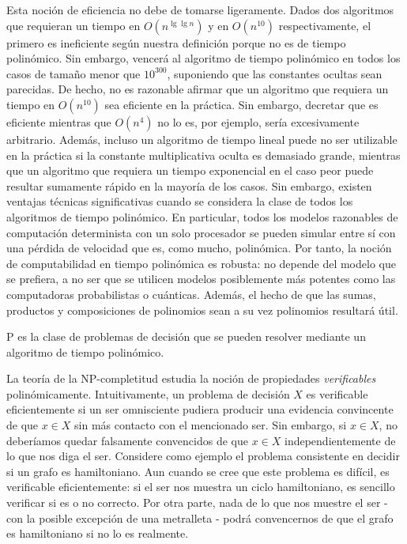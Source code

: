 Esta noción de eficiencia no debe de tomarse ligeramente. Dados dos algoritmos que requieran un tiempo en $O(n^{\lg \lg n})$ y en $O(n^{10})$ respectivamente, el primero es ineficiente según nuestra definición porque no es de tiempo polinómico. Sin embargo, vencerá al algoritmo de tiempo polinómico en todos los casos de tamaño menor que $10^{300}$, suponiendo que las constantes ocultas sean parecidas. De hecho, no es razonable afirmar que un algoritmo que requiera un tiempo en $O(n^{10})$ sea eficiente en la práctica. Sin embargo, decretar que es eficiente mientras que $O(n^4)$ no lo es, por ejemplo, sería excesivamente arbitrario. Además, incluso un algoritmo de tiempo lineal puede no ser utilizable en la práctica si la constante multiplicativa oculta es demasiado grande, mientras que un algoritmo que requiera un tiempo exponencial en el caso peor puede resultar sumamente rápido en la mayoría de los casos. Sin embargo, existen ventajas técnicas significativas cuando se considera la clase de todos los algoritmos de tiempo polinómico. En particular, todos los modelos razonables de computación determinista con un solo procesador se pueden simular entre sí con una pérdida de velocidad que es, como mucho, polinómica. Por tanto, la noción de computabilidad en tiempo polinómica es robusta: no depende del modelo que se prefiera, a no ser que se utilicen modelos posiblemente más potentes como las computadoras probabilistas o cuánticas. Además, el hecho de que las sumas, productos y composiciones de polinomios sean a su vez polinomios resultará útil.\\

\begin{fondo}
P es la clase de problemas de decisión que se pueden resolver mediante un algoritmo de tiempo polinómico.
\end{fondo}

La teoría de la NP-completitud estudia la noción de propiedades \emph{verificables} polinómicamente. Intuitivamente, un problema de decisión $X$ es verificable eficientemente si un ser omnisciente pudiera producir una evidencia convincente de que $x \in X$ sin más contacto con el mencionado ser. Sin embargo, si $x \in X$, no deberíamos quedar falsamente convencidos de que $x \in X$ independientemente de lo que nos diga el ser. Considere como ejemplo el problema consistente en decidir si un grafo es hamiltoniano. Aun cuando se cree que este problema es difícil, es verificable eficientemente: si el ser nos muestra un ciclo hamiltoniano, es sencillo verificar si es o no correcto. Por otra parte, nada de lo que nos muestre el ser - con la posible excepción de una metralleta - podrá convencernos de que el grafo es hamiltoniano si no lo es realmente.\\

